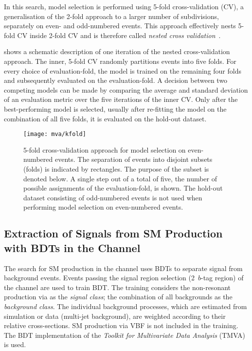 In this search, model selection is performed using 5-fold
cross-validation (CV), a generalisation of the 2-fold approach to a
larger number of subdivisions, separately on even- and odd-numbered
events. This approach effectively nests 5-fold CV inside 2-fold CV and
is therefore called \emph{nested cross
  validation}~\cite{cawley10,stone74}.

 shows a schematic description of one
iteration of the nested cross-validation approach. The inner, 5-fold
CV randomly partitions events into five folds. For every choice of
evaluation-fold, the model is trained on the remaining four folds and
subsequently evaluated on the evaluation-fold. A decision between two
competing models can be made by comparing the average and standard
deviation of an evaluation metric over the five iterations of the inner
CV. Only after the best-performing model is selected, usually after
re-fitting the model on the combination of all five folds, it is
evaluated on the hold-out dataset.

\begin{figure}[htbp]
  \centering

  \texttt{[image: mva/kfold]}

  \caption{5-fold cross-validation approach for model selection on
    even-numbered events. The separation of events into disjoint
    subsets (folds) is indicated by rectangles. The purpose of the
    subset is denoted below. A single step out of a total of five, the
    number of possible assignments of the evaluation-fold, is
    shown. The hold-out dataset consisting of odd-numbered events is
    not used when performing model selection on even-numbered
    events.}%
  \label{fig:cross_validation}
\end{figure}



\subsection{Extraction of Signals from SM \HH Production with BDTs in
  the \hadhad Channel}%
\label{sec:mva_smbdt}

The search for SM \HH production in the \hadhad channel uses BDTs to
separate signal from background events. Events passing the signal
region selection (2~$b$-tag region) of the \hadhad channel are used to
train BDT. The training considers the non-resonant \HH production via
\ggF as the \emph{signal class}; the combination of all backgrounds as
the \emph{background class}. The individual background processes,
which are estimated from simulation or data (multi-jet background),
are weighted according to their relative cross-sections. SM \HH
production via VBF is not included in the training.
The BDT implementation of the \emph{Toolkit for Multivariate Data
  Analysis} (TMVA)~\cite{Hocker:2007ht} is used.



